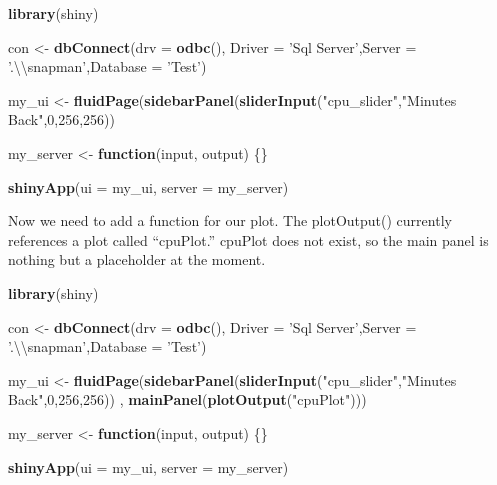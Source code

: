 \documentclass[]{article}
\newenvironment{Shaded}{\begin{snugshade}}{\end{snugshade}}
\newcommand{\CharTok}[1]{\textcolor[rgb]{0.31,0.60,0.02}{#1}}
\newcommand{\ControlFlowTok}[1]{\textcolor[rgb]{0.13,0.29,0.53}{\textbf{#1}}}
\newcommand{\DataTypeTok}[1]{\textcolor[rgb]{0.13,0.29,0.53}{#1}}
\newcommand{\DecValTok}[1]{\textcolor[rgb]{0.00,0.00,0.81}{#1}}
\newcommand{\KeywordTok}[1]{\textcolor[rgb]{0.13,0.29,0.53}{\textbf{#1}}}
\newcommand{\NormalTok}[1]{#1}
\newcommand{\StringTok}[1]{\textcolor[rgb]{0.31,0.60,0.02}{#1}}
\begin{document}
\begin{Shaded}
\begin{Highlighting}[]
\KeywordTok{library}\NormalTok{(shiny)}

\NormalTok{con <-}\StringTok{ }\KeywordTok{dbConnect}\NormalTok{(}\DataTypeTok{drv =} \KeywordTok{odbc}\NormalTok{(),  }\DataTypeTok{Driver =} \StringTok{'Sql Server'}\NormalTok{,}\DataTypeTok{Server =} \StringTok{'.}\CharTok{\textbackslash{}\textbackslash{}}\StringTok{snapman'}\NormalTok{,}\DataTypeTok{Database =} \StringTok{'Test'}\NormalTok{)}

\NormalTok{my_ui <-}\StringTok{ }\KeywordTok{fluidPage}\NormalTok{(}\KeywordTok{sidebarPanel}\NormalTok{(}\KeywordTok{sliderInput}\NormalTok{(}\StringTok{"cpu_slider"}\NormalTok{,}\StringTok{"Minutes Back"}\NormalTok{,}\DecValTok{0}\NormalTok{,}\DecValTok{256}\NormalTok{,}\DecValTok{256}\NormalTok{))}

\NormalTok{my_server <-}\StringTok{ }\ControlFlowTok{function}\NormalTok{(input, output) \{\}}

\KeywordTok{shinyApp}\NormalTok{(}\DataTypeTok{ui =}\NormalTok{ my_ui, }\DataTypeTok{server =}\NormalTok{ my_server)}
\end{Highlighting}
\end{Shaded}

Now we need to add a function for our plot. The plotOutput() currently
references a plot called ``cpuPlot.'' cpuPlot does not exist, so the
main panel is nothing but a placeholder at the moment.

\begin{Shaded}
\begin{Highlighting}[]
\KeywordTok{library}\NormalTok{(shiny)}

\NormalTok{con <-}\StringTok{ }\KeywordTok{dbConnect}\NormalTok{(}\DataTypeTok{drv =} \KeywordTok{odbc}\NormalTok{(),  }\DataTypeTok{Driver =} \StringTok{'Sql Server'}\NormalTok{,}\DataTypeTok{Server =} \StringTok{'.}\CharTok{\textbackslash{}\textbackslash{}}\StringTok{snapman'}\NormalTok{,}\DataTypeTok{Database =} \StringTok{'Test'}\NormalTok{)}

\NormalTok{my_ui <-}\StringTok{ }\KeywordTok{fluidPage}\NormalTok{(}\KeywordTok{sidebarPanel}\NormalTok{(}\KeywordTok{sliderInput}\NormalTok{(}\StringTok{"cpu_slider"}\NormalTok{,}\StringTok{"Minutes Back"}\NormalTok{,}\DecValTok{0}\NormalTok{,}\DecValTok{256}\NormalTok{,}\DecValTok{256}\NormalTok{))}
\NormalTok{                   , }\KeywordTok{mainPanel}\NormalTok{(}\KeywordTok{plotOutput}\NormalTok{(}\StringTok{"cpuPlot"}\NormalTok{)))}

\NormalTok{my_server <-}\StringTok{ }\ControlFlowTok{function}\NormalTok{(input, output) \{\}}

\KeywordTok{shinyApp}\NormalTok{(}\DataTypeTok{ui =}\NormalTok{ my_ui, }\DataTypeTok{server =}\NormalTok{ my_server)}
\end{Highlighting}
\end{Shaded}
\end{document}

